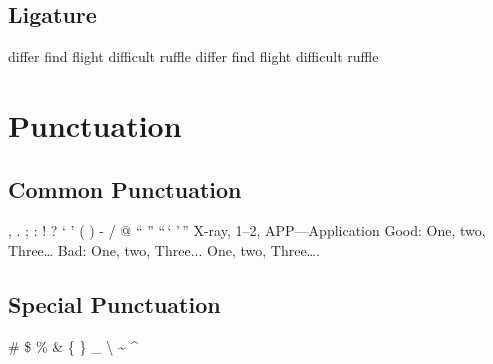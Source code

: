 \documentclass{article}
\begin{document}
        \subsection{Ligature}
            differ find flight difficult ruffle\newline
            dif{}fer f{}ind f\/light dif\/f\/icult ruffle

    \section{Punctuation}
        \subsection{Common Punctuation}
            , \quad . \quad ; \quad :\newline
            ! \quad ? \quad ` \quad '\newline
            ( \quad ) \quad [ \quad ]\newline
            \quad - \quad / \quad * \quad @\newline
            `` \quad '' \quad ``\,` '\,''\newline
            X-ray, 1--2, APP---Application\newline
            Good: One, two, Three\dots\newline
            Bad: One, two, Three...\newline
            One, two, Three\dots.
        
        \subsection{Special Punctuation}
            \# \quad \$ \quad \% \quad \&\newline
            \{ \quad \} \quad \_ \quad \textbackslash\newline
            \~{} \quad \^{} \quad 
\end{document}
